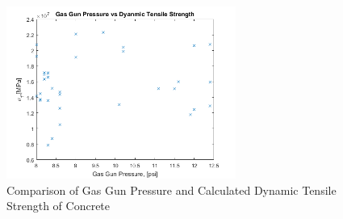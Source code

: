 \documentclass[12pt]{article}
\begin{document}
\begin{figure}[H]
	\centering
	\includegraphics[width=0.67\textwidth]{Pressure_TensileStrength.png}
	\caption{Comparison of Gas Gun Pressure and Calculated Dynamic Tensile Strength of Concrete}
	\label{fig:GasGun}
\end{figure}
\end{document}
